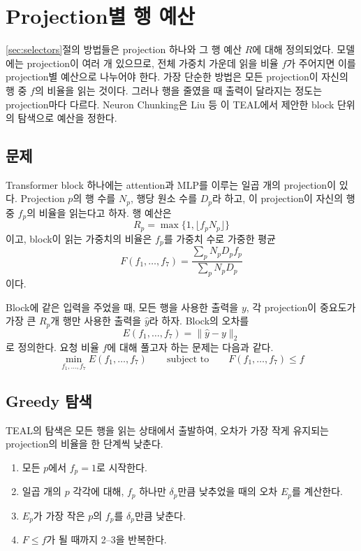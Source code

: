 \section{Projection별 행 예산}\label{sec:budgets}

\ref{sec:selectors}절의 방법들은 projection 하나와 그 행 예산 $R$에 대해 정의되었다. 모델에는 projection이 여러 개 있으므로, 전체 가중치 가운데 읽을 비율 $f$가 주어지면 이를 projection별 예산으로 나누어야 한다. 가장 단순한 방법은 모든 projection이 자신의 행 중 $f$의 비율을 읽는 것이다. 그러나 행을 줄였을 때 출력이 달라지는 정도는 projection마다 다르다. Neuron Chunking은 Liu 등 \cite{liu2025}이 TEAL에서 제안한 block 단위의 탐색으로 예산을 정한다.

\subsection{문제}\label{sec:budgets-problem}

Transformer block 하나에는 attention과 MLP를 이루는 일곱 개의 projection이 있다. Projection $p$의 행 수를 $N_p$, 행당 원소 수를 $D_p$라 하고, 이 projection이 자신의 행 중 $f_p$의 비율을 읽는다고 하자. 행 예산은
\[
R_p=\max\{1,\lfloor f_pN_p\rfloor\}
\]
이고, block이 읽는 가중치의 비율은 $f_p$를 가중치 수로 가중한 평균
\[
F(f_1,\ldots,f_7)=\frac{\sum_pN_pD_pf_p}{\sum_pN_pD_p}
\]
이다.

Block에 같은 입력을 주었을 때, 모든 행을 사용한 출력을 $y$, 각 projection이 중요도가 가장 큰 $R_p$개 행만 사용한 출력을 $\hat y$라 하자. Block의 오차를
\[
E(f_1,\ldots,f_7)=\lVert\hat y-y\rVert_2
\]
로 정의한다. 요청 비율 $f$에 대해 풀고자 하는 문제는 다음과 같다.
\[
\boxed{
\min_{f_1,\ldots,f_7}E(f_1,\ldots,f_7)
\qquad\text{subject to}\qquad
F(f_1,\ldots,f_7)\le f
}
\]

\subsection{Greedy 탐색}\label{sec:budgets-search}

TEAL의 탐색은 모든 행을 읽는 상태에서 출발하여, 오차가 가장 작게 유지되는 projection의 비율을 한 단계씩 낮춘다.

\begin{enumerate}
\item 모든 $p$에서 $f_p=1$로 시작한다.
\item 일곱 개의 $p$ 각각에 대해, $f_p$ 하나만 $\delta_p$만큼 낮추었을 때의 오차 $E_p$를 계산한다.
\item $E_p$가 가장 작은 $p$의 $f_p$를 $\delta_p$만큼 낮춘다.
\item $F\le f$가 될 때까지 2--3을 반복한다.
\end{enumerate}

